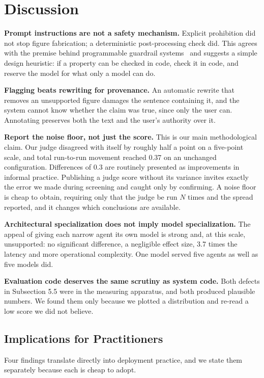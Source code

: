 \documentclass[9pt,twocolumn]{extarticle}
\begin{document}
\section{Discussion}

\textbf{Prompt instructions are not a safety mechanism.} Explicit prohibition
did not stop figure fabrication; a deterministic post-processing check did. This
agrees with the premise behind programmable guardrail
systems~\cite{rebedea2023nemo} and suggests a simple design heuristic: if a
property can be checked in code, check it in code, and reserve the model for
what only a model can do.

\textbf{Flagging beats rewriting for provenance.} An automatic rewrite that
removes an unsupported figure damages the sentence containing it, and the system
cannot know whether the claim was true, since only the user can. Annotating
preserves both the text and the user's authority over it.

\textbf{Report the noise floor, not just the score.} This is our main
methodological claim. Our judge disagreed with itself by roughly half a point
on a five-point scale, and total run-to-run movement reached 0.37 on an
unchanged configuration. Differences of 0.3 are routinely presented as
improvements in informal practice. Publishing a judge score without its
variance invites exactly the error we made during screening and caught only by
confirming. A noise floor is cheap to obtain, requiring only that the judge be
run $N$ times and the spread reported, and it changes which conclusions are
available.

\textbf{Architectural specialization does not imply model specialization.} The
appeal of giving each narrow agent its own model is strong and, at this scale,
unsupported: no significant difference, a negligible effect size, 3.7 times the
latency and more operational complexity. One model served five agents as well
as five models did.

\textbf{Evaluation code deserves the same scrutiny as system code.} Both
defects in Subsection 5.5 were in the measuring apparatus, and both produced
plausible numbers. We found them only because we plotted a distribution and
re-read a low score we did not believe.

\subsection{Implications for Practitioners}
Four findings translate directly into deployment practice, and we state them
separately because each is cheap to adopt.
\end{document}
